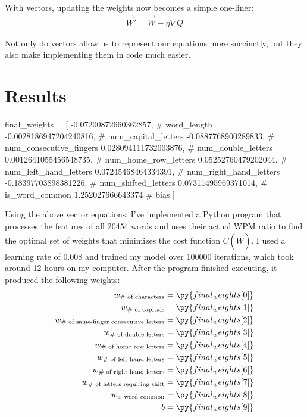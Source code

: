 \documentclass[12pt]{article}
\begin{document}
With vectors, updating the weights now becomes a simple one-liner:
\begin{align*}
	\vec{W}' = \vec{W} - \eta\nabla Q
\end{align*}

Not only do vectors allow us to represent our equations more succinctly, but they also make implementing them in code much easier.

\section*{Results}

\begin{pycode}
final_weights = [
	-0.07200872660362857, # word_length
	-0.0028186947204240816, # num_capital_letters
	-0.0887768900289833, # num_consecutive_fingers
	0.028094111732003876, # num_double_letters
	0.0012641055456548735, # num_home_row_letters
	0.05252760479202044, # num_left_hand_letters
	0.07245468464334391, # num_right_hand_letters
	-0.18397703898381226, # num_shifted_letters
	0.07311495969371014, # is_word_common
	1.252027666643374 # bias
]
\end{pycode}

Using the above vector equations, I've implemented a Python program that processes the features of all 20454 words and uses their actual WPM ratio to find the optimal set of weights that minimizes the cost function $C(\vec{W})$. I used a learning rate of 0.008 and trained my model over 100000 iterations, which took around 12 hours on my computer. After the program finished executing, it produced the following weights:
\begin{align*}
	w_{\text{\# of characters}}
	 & = \py{final_weights[0]}
	\\
	w_{\text{\# of capitals}}
	 & = \py{final_weights[1]}
	\\
	w_{\text{\# of same-finger consecutive letters}}
	 & = \py{final_weights[2]}
	\\
	w_{\text{\# of double letters}}
	 & = \py{final_weights[3]}
	\\
	w_{\text{\# of home row letters}}
	 & = \py{final_weights[4]}
	\\
	w_{\text{\# of left hand letters}}
	 & = \py{final_weights[5]}
	\\
	w_{\text{\# of right hand letters}}
	 & = \py{final_weights[6]}
	\\
	w_{\text{\# of letters requiring shift}}
	 & = \py{final_weights[7]}
	\\
	w_{\text{is word common}}
	 & =\py{final_weights[8]}
	\\
	b
	 & = \py{final_weights[9]}
\end{align*}
\end{document}
